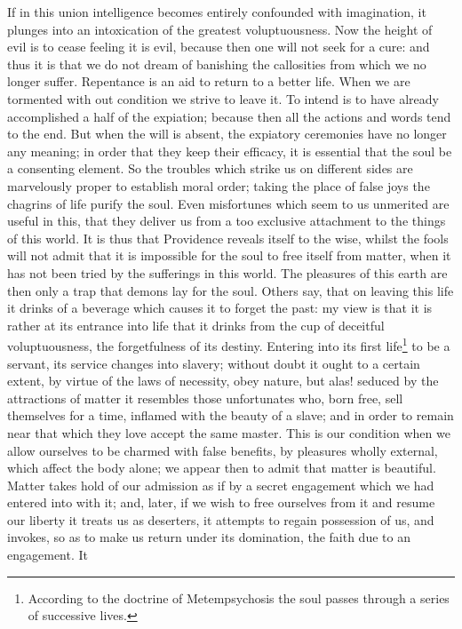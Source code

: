 \documentclass[12pt]{article}
\begin{document}
If in this union intelligence becomes entirely confounded with imagination, it
plunges into an intoxication of the greatest voluptuousness. Now the height of
evil is to cease feeling it is evil, because then one will not seek for a cure:
and thus it is that we do not dream of banishing the callosities from which we
no longer suffer. Repentance is an aid to return to a better life. When we are
tormented with out condition we strive to leave it. To intend is to have
already accomplished a half of the expiation; because then all the actions and
words tend to the end. But when the will is absent, the expiatory ceremonies
have no longer any meaning; in order that they keep their efficacy, it is
essential that the soul be a consenting element. So the troubles which strike
us on different sides are marvelously proper to establish moral order; taking
the place of false joys the chagrins of life purify the soul. Even misfortunes
which seem to us unmerited are useful in this, that they deliver us from a too
exclusive attachment to the things of this world. It is thus that Providence
reveals itself to the wise, whilst the fools will not admit that it is
impossible for the soul to free itself from matter, when it has not been tried
by the sufferings in this world. The pleasures of this earth are then only a
trap that demons lay for the soul.  Others say, that on leaving this life it
drinks of a beverage which causes it to forget the past: my view is that it is
rather at its entrance into life that it drinks from the cup of deceitful
voluptuousness, the forgetfulness of its destiny. Entering into its first
life\footnote{According to the doctrine of Metempsychosis the soul passes
through a series of successive lives.} to be a servant, its service changes
into slavery; without doubt it ought to a certain extent, by virtue of the laws
of necessity, obey nature, but alas! seduced by the attractions of matter it
resembles those unfortunates who, born free, sell themselves for a time, inflamed
with the beauty of a slave; and in order to remain near that which they love
accept the same master. This is our condition when we allow ourselves to be
charmed with false benefits, by pleasures wholly external, which affect the
body alone; we appear then to admit that matter is beautiful. Matter takes hold
of our admission as if by a secret engagement which we had entered into with
it; and, later, if we wish to free ourselves from it and resume our liberty it
treats us as deserters, it attempts to regain possession of us, and invokes, so
as to make us return under its domination, the faith due to an engagement. It
\end{document}

